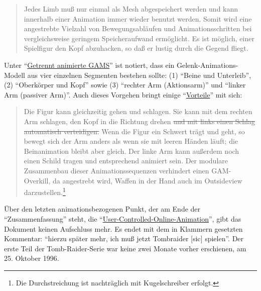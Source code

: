 \documentclass[a5paper,pagesize,numbers=noenddot]{scrbook}
\begin{document}
\begin{quote}
   Jedes Limb muß nur einmal als Mesh abgespeichert werden und kann innerhalb einer Animation immer wieder benutzt werden.
   Somit wird eine angestrebte Vielzahl von Bewegungsabläufen und Animationsschritten bei vergleichsweise geringem Speicheraufwand ermöglicht.
   Es ist möglich, einer Spielfigur den Kopf abzuhacken, so daß er lustig durch die Gegend fliegt.
\end{quote}

Unter \enquote{\uline{Getrennt animierte GAMS}} ist notiert, dass ein Gelenk-Animations-Modell aus vier einzelnen Segmenten bestehen sollte: (1) \enquote{Beine und Unterleib}, (2) \enquote{Oberkörper und Kopf} sowie (3) \enquote{rechter Arm (Aktionsarm)} und \enquote{linker Arm (passiver Arm)}.
Auch dieses Vorgehen bringt einige \enquote{\uline{Vorteile}} mit sich:

\begin{quote}
   Die Figur kann gleichzeitig gehen und schlagen.
   Sie kann mit dem rechten Arm schlagen, den Kopf in die Richtung drehen \sout{und mit links einen Schlag automatisch verteidigen.}
   Wenn die Figur ein Schwert trägt und geht, so bewegt sich der Arm anders als wenn sie mit leeren Händen läuft; die Beinanimation bleibt aber gleich.
   Der linke Arm kann außerdem noch einen Schild tragen und entsprechend animiert sein.
   Der modulare Zusammenbau dieser Animationssequenzen verhindert einen GAM-Overkill, da angestrebt wird, Waffen in der Hand auch im Outsideview darzustellen.\footnote{Die Durchstreichung ist nachträglich mit Kugelschreiber erfolgt.}
\end{quote}

Über den letzten animationsbezogenen Punkt, der am Ende der \enquote{Zusammenfassung} steht, die \enquote{\uline{User-Controlled-Online-Animation}}, gibt das Dokument keinen Aufschluss mehr. %
Es endet mit dem in Klammern gesetzten Kommentar: \enquote{hierzu später mehr, ich muß jetzt Tombraider [sic] spielen}.
Der erste Teil der Tomb-Raider-Serie war keine zwei Monate vorher erschienen, am 25. Oktober 1996.


\end{document}
